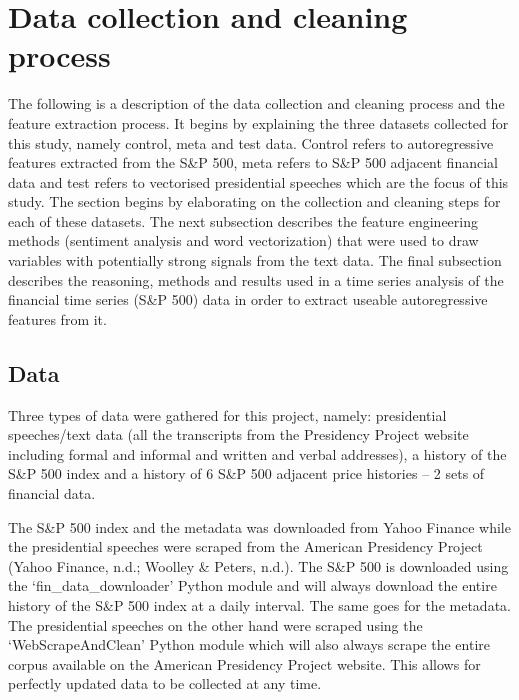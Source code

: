 \documentclass[11pt,preprint, authoryear]{elsarticle}
\numberwithin{equation}{section}
\numberwithin{figure}{section}
\numberwithin{table}{section}
\begin{document}
\hypertarget{data-collection-and-cleaning-process}{%
\section{Data collection and cleaning
process}\label{data-collection-and-cleaning-process}}

The following is a description of the data collection and cleaning
process and the feature extraction process. It begins by explaining the
three datasets collected for this study, namely control, meta and test
data. Control refers to autoregressive features extracted from the S\&P
500, meta refers to S\&P 500 adjacent financial data and test refers to
vectorised presidential speeches which are the focus of this study. The
section begins by elaborating on the collection and cleaning steps for
each of these datasets. The next subsection describes the feature
engineering methods (sentiment analysis and word vectorization) that
were used to draw variables with potentially strong signals from the
text data. The final subsection describes the reasoning, methods and
results used in a time series analysis of the financial time series
(S\&P 500) data in order to extract useable autoregressive features from
it.

\hypertarget{data-1}{%
\subsection{Data}\label{data-1}}

Three types of data were gathered for this project, namely: presidential
speeches/text data (all the transcripts from the Presidency Project
website including formal and informal and written and verbal addresses),
a history of the S\&P 500 index and a history of 6 S\&P 500 adjacent
price histories -- 2 sets of financial data.

The S\&P 500 index and the metadata was downloaded from Yahoo Finance
while the presidential speeches were scraped from the American
Presidency Project (Yahoo Finance, n.d.; Woolley \& Peters, n.d.). The
S\&P 500 is downloaded using the `fin\_data\_downloader' Python module
and will always download the entire history of the S\&P 500 index at a
daily interval. The same goes for the metadata. The presidential
speeches on the other hand were scraped using the `WebScrapeAndClean'
Python module which will also always scrape the entire corpus available
on the American Presidency Project website. This allows for perfectly
updated data to be collected at any time.
\end{document}
